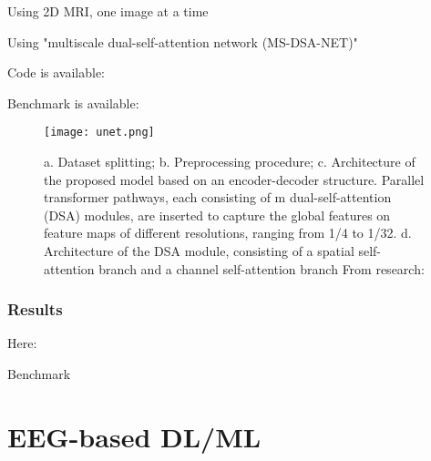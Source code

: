 Using 2D MRI, one image at a time

Using "multiscale dual-self-attention network (MS-DSA-NET)"

Code is available: 

Benchmark is available: 

\begin{figure}[htbp]
	\centering
	\texttt{[image: unet.png]}
	\caption{a. Dataset splitting; b. Preprocessing procedure; c. Architecture of the proposed model based on an encoder-decoder structure. Parallel transformer pathways, each consisting of m dual-self-attention (DSA) modules, are inserted to capture the global features on feature maps of different resolutions, ranging from 1/4 to 1/32. d. Architecture of the DSA module, consisting of a spatial self-attention branch and a channel self-attention branch From research: }
	\label{fig:res8}
\end{figure}

\subsubsection{Results}

Here: 

\begin{table}[htbp]
	\centering
	\caption{Benchmark}

	\caption{Results from }
	\label{tab:res8}
\end{table}


\section{EEG-based DL/ML}


